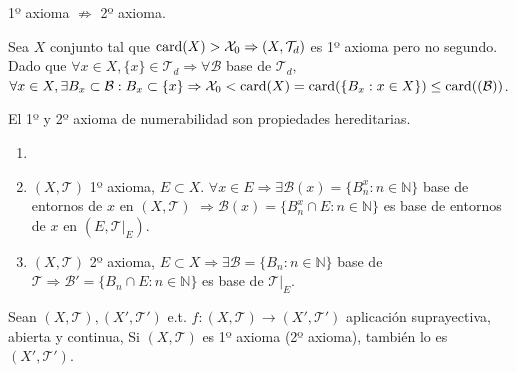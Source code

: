 \begin{obs}
  1º axioma $\not \Rightarrow $ 2º axioma.

  Sea $X$ conjunto tal que $ \operatorname{card}(X) > \mathcal{X}_{0} \Rightarrow ( X, \mathcal{T}_{d} )$ es 1º axioma pero no segundo. Dado que $ \forall x \in X, \{ x \} \in \mathcal{T}_{d} \Rightarrow \forall \mathcal{B}$ base de $\mathcal{T}_{d},$ $\forall x \in X, \exists B_{x} \subset \mathcal{B} : B_{x} \subset \{ x \} \Rightarrow \mathcal{X}_0 < \operatorname{card}(X) = \operatorname{card}( \{ B_{x} : x \in X \}) \leq \operatorname{card} ((\mathcal{B}))$.
\end{obs}

\begin{prop}
  El 1º y 2º axioma de numerabilidad son propiedades hereditarias.
\end{prop}

\begin{dem}
  \begin{enumerate}[label=(\roman*)]
    \item []
    \item  $( X, \mathcal{T} )$ 1º axioma, $E \subset X$. $\forall x \in E \Rightarrow \exists \mathcal{B} (x) = \{  B_{n}^{x} : n \in \mathbb{N} \}$ base de entornos de $x$ en $( X, \mathcal{T} )$ $\Rightarrow \mathcal{B}(x) = \{  B_{n}^{x} \cap E : n \in \mathbb{N} \}$ es base de entornos de $x$ en $ ( E, \mathcal{T}|_{E})$.
    \item $( X, \mathcal{T} )$ 2º axioma, $E \subset X \Rightarrow \exists \mathcal{B} = \{ B_{n} : n \in \mathbb{N} \}$ base de $\mathcal{T} \Rightarrow \mathcal{B}' = \{  B_{n} \cap E : n \in \mathbb{N} \}$ es base de $\mathcal{T}|_{E}$.
  \end{enumerate}
\end{dem}

\begin{prop}
  Sean $( X, \mathcal{T} ), ( X', \mathcal{T}' )$ e.t. $f: ( X, \mathcal{T} ) \to ( X', \mathcal{T}' )$ aplicación suprayectiva, abierta y continua, Si $( X, \mathcal{T} )$ es 1º axioma (2º axioma), también lo es $( X', \mathcal{T}' )$.
\end{prop}

